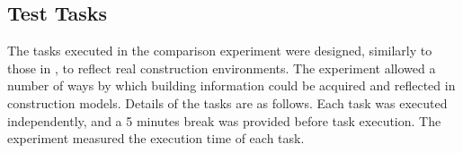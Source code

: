

\subsection{Test Tasks}


The tasks executed in the comparison experiment were designed, similarly to those in \cite{yeh_-site_2012}, to reflect real construction environments. The experiment allowed a number of ways by which building information could be acquired and reflected in construction models. Details of the tasks are as follows. Each task was executed independently, and a 5 minutes break was provided before task execution. The experiment measured the execution time of each task.

